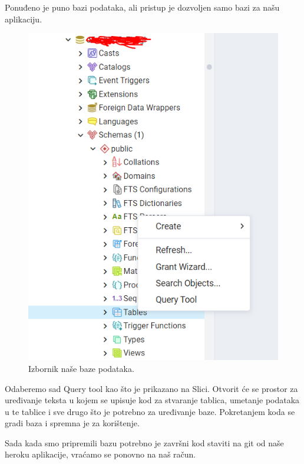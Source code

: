 			 Ponuđeno je puno bazi podataka, ali pristup je dozvoljen samo bazi za našu aplikaciju.
			  \begin{figure}[H]
			 	\includegraphics[scale=0.7]{slike/baza.png} 
			 	\centering
			 	\caption{ Izbornik naše baze podataka.}
			 	\label{DS}
			 \end{figure}
			 
			 Odaberemo sad Query tool kao što je prikazano na Slici. Otvorit će se prostor za uređivanje teksta u kojem se upisuje kod za stvaranje tablica, umetanje podataka u te tablice i sve drugo što je potrebno za uređivanje baze. Pokretanjem koda se gradi baza i spremna je za korištenje. 
			 
			 Sada kada smo pripremili bazu potrebno je završni kod staviti na git od naše heroku aplikacije, vraćamo se ponovno na naš račun.
			 
